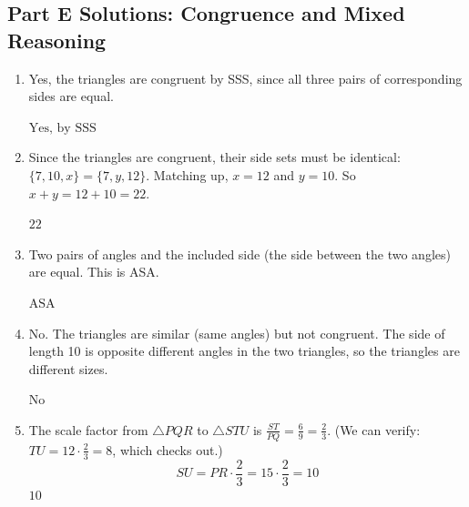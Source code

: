 \documentclass[14pt]{extarticle}
\begin{document}
\subsection*{Part E Solutions: Congruence and Mixed Reasoning}
\begin{enumerate}
  \item Yes, the triangles are congruent by SSS, since all three pairs of corresponding sides are equal.

  \(\boxed{\text{Yes, by SSS}}\)

  \item Since the triangles are congruent, their side sets must be identical: \(\{7, 10, x\} = \{7, y, 12\}\). Matching up, \(x = 12\) and \(y = 10\). So \(x + y = 12 + 10 = 22\).

  \(\boxed{22}\)

  \item Two pairs of angles and the included side (the side between the two angles) are equal. This is ASA.

  \(\boxed{\text{ASA}}\)

  \item No. The triangles are similar (same angles) but not congruent. The side of length 10 is opposite different angles in the two triangles, so the triangles are different sizes.

  \(\boxed{\text{No}}\)

  \item The scale factor from \(\triangle PQR\) to \(\triangle STU\) is \(\frac{ST}{PQ} = \frac{6}{9} = \frac{2}{3}\). (We can verify: \(TU = 12 \cdot \frac{2}{3} = 8\), which checks out.)
  \[
  SU = PR \cdot \frac{2}{3} = 15 \cdot \frac{2}{3} = 10
  \]
  \(\boxed{10}\)
\end{enumerate}

\end{document}

